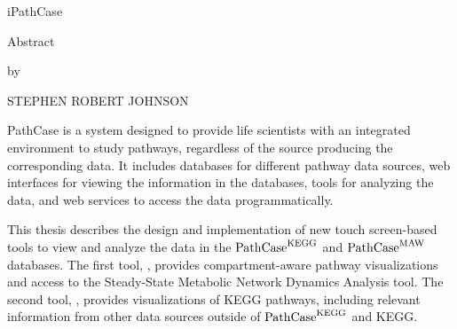 \newcommand{\pathcasekegg}{$\mathrm{Path\-Case}^\mathrm{KEGG}$\xspace}
\newcommand{\pathcasemaw}{$\mathrm{Path\-Case}^\mathrm{MAW}$\xspace}
\newcommand{\pathcasesb}{$\mathrm{Path\-Case}^\mathrm{SB}$\xspace}
\newcommand{\boldpathcasekegg}{$\mathbf{Path\-Case}^\mathbf{KEGG}$\xspace}
\newcommand{\boldpathcasemaw}{$\mathbf{Path\-Case}^\mathbf{MAW}$\xspace}

\begin{center}
    iPathCase

    Abstract

    by

    STEPHEN ROBERT JOHNSON
\end{center}

PathCase is a system designed to provide life scientists with an integrated
environment to study pathways, regardless of the source producing the
corresponding data. It includes databases for different pathway data sources,
web interfaces for viewing the information in the databases, tools for analyzing
the data, and web services to access the data programmatically.

This thesis describes the design and implementation of new touch screen-based
tools to view and analyze the data in the \pathcasekegg and \pathcasemaw
databases. The first tool, \mawapp, provides compartment-aware pathway
visualizations and access to the Steady-State Metabolic Network Dynamics
Analysis tool. The second tool, \keggapp, provides visualizations of KEGG
pathways, including relevant information from other data sources outside of
\pathcasekegg and KEGG.
